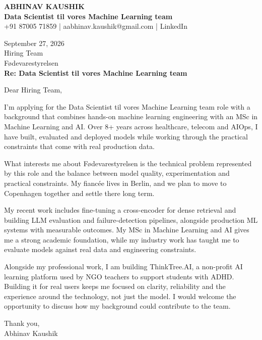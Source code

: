 \documentclass[10pt,a4paper]{article}
\begin{document}
\begin{center}
{\Large\bfseries ABHINAV KAUSHIK}\\[2pt]
{\bfseries Data Scientist til vores Machine Learning team}\\[2pt]
+91 87005 71859 \quad | \quad aabhinav.kaushik@gmail.com \quad | \quad LinkedIn
\end{center}
\vspace{8pt}
September 27, 2026\\[6pt]
Hiring Team\\
Fødevarestyrelsen\\[4pt]
\textbf{Re: Data Scientist til vores Machine Learning team}

Dear Hiring Team,

I’m applying for the Data Scientist til vores Machine Learning team role with a background that combines hands-on machine learning engineering with an MSc in Machine Learning and AI. Over 8+ years across healthcare, telecom and AIOps, I have built, evaluated and deployed models while working through the practical constraints that come with real production data.

What interests me about Fødevarestyrelsen is the technical problem represented by this role and the balance between model quality, experimentation and practical constraints. My fiancée lives in Berlin, and we plan to move to Copenhagen together and settle there long term.

My recent work includes fine-tuning a cross-encoder for dense retrieval and building LLM evaluation and failure-detection pipelines, alongside production ML systems with measurable outcomes. My MSc in Machine Learning and AI gives me a strong academic foundation, while my industry work has taught me to evaluate models against real data and engineering constraints.

Alongside my professional work, I am building ThinkTree.AI, a non-profit AI learning platform used by NGO teachers to support students with ADHD. Building it for real users keeps me focused on clarity, reliability and the experience around the technology, not just the model. I would welcome the opportunity to discuss how my background could contribute to the team.

Thank you,\\
Abhinav Kaushik
\end{document}
